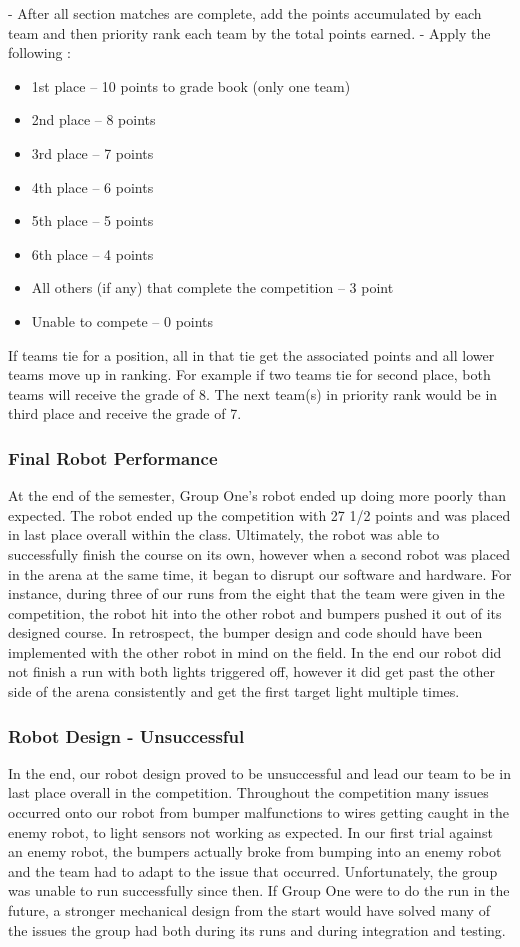 \documentclass{article}
\begin{document}
- After all section matches are complete, add the points accumulated by each team and then priority rank each team by the total points earned. - Apply the following :
\begin{itemize}
    \item 1st  place – 10 points to grade book (only one team)
    \item 2nd place – 8 points
    \item 3rd place – 7 points
    \item 4th place – 6 points
    \item 5th place – 5 points
    \item 6th place – 4 points
    \item All others (if any) that complete the competition – 3 point
    \item Unable to compete – 0 points
\end{itemize}

If teams tie for a position, all in that tie get the associated points and all lower teams move up in ranking.  For example if two teams tie for second place, both teams will receive the grade of 8. The next team(s) in priority rank would be in third place and receive the grade of 7.

\subsubsection{Final Robot Performance}
At the end of the semester, Group One's robot ended up doing more poorly than expected. The robot ended up the competition with 27 1/2 points and was placed in last place overall within the class. Ultimately, the robot was able to successfully finish the course on its own, however when a second robot was placed in the arena at the same time, it began to disrupt our software and hardware. For instance, during three of our runs from the eight that the team were given in the competition, the robot hit into the other robot and bumpers pushed it out of its designed course. In retrospect, the bumper design and code should have been implemented with the other robot in mind on the field. In the end our robot did not finish a run with both lights triggered off, however it did get past the other side of the arena consistently and get the first target light multiple times.

\subsubsection{Robot Design - Unsuccessful}
In the end, our robot design proved to be unsuccessful and lead our team to be in last place overall in the competition. Throughout the competition many issues occurred onto our robot from bumper malfunctions to wires getting caught in the enemy robot, to light sensors not working as expected. In our first trial against an enemy robot, the bumpers actually broke from bumping into an enemy robot and the team had to adapt to the issue that occurred. Unfortunately, the group was unable to run successfully since then. If Group One were to do the run in the future, a stronger mechanical design from the start would have solved many of the issues the group had both during its runs and during integration and testing. 
\end{document}
